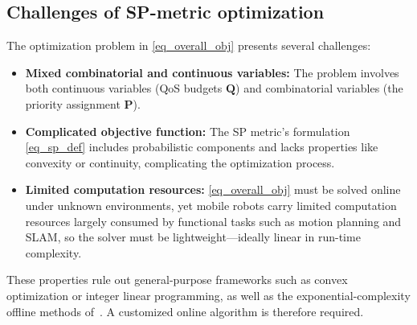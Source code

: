 




	\subsection{Challenges of SP-metric optimization}

    The optimization problem in \eqref{eq_overall_obj} presents several challenges:
\begin{itemize}
    \item \textbf{Mixed combinatorial and continuous variables:} The problem involves both continuous variables (QoS budgets $\boldsymbol{Q}$) and combinatorial variables (the priority assignment $\boldsymbol{P}$).
    \item \textbf{Complicated objective function:} The SP metric's formulation \eqref{eq_sp_def} includes probabilistic components and lacks properties like convexity or continuity, complicating the optimization process.
    \item \textbf{Limited computation resources:} \eqref{eq_overall_obj} must be solved online under unknown environments, yet mobile robots carry limited computation resources largely consumed by functional tasks such as motion planning and SLAM, so the solver must be lightweight---ideally linear in run-time complexity.
\end{itemize}
    These properties rule out general-purpose frameworks such as convex optimization or integer linear programming, as well as the exponential-complexity offline methods of~\cite{zhao2018unified, Wang2023OptimizingLET, Verucchi2020LatencyAwareGO}.
    A customized online algorithm is therefore required.

